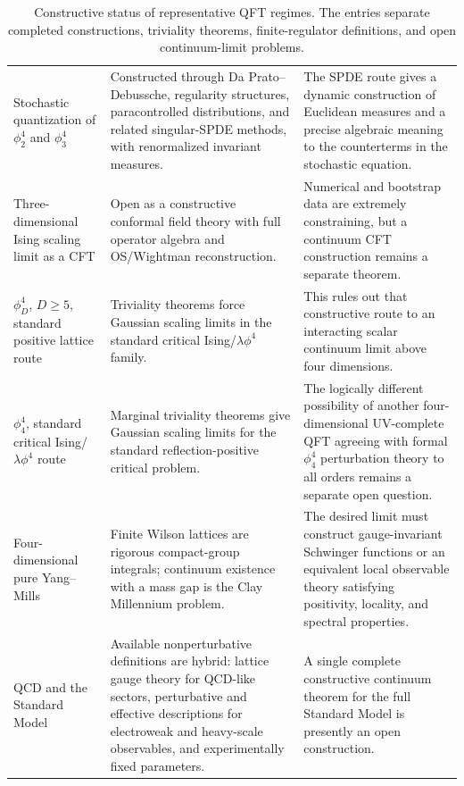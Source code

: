 \begin{table}[H]
\begin{tabular}{@{}>{\raggedright\arraybackslash}p{}
  >{\raggedright\arraybackslash}p{}
  >{\raggedright\arraybackslash}p{}@{}}
Stochastic quantization of \(\phi^4_2\) and \(\phi^4_3\) &
Constructed through Da Prato--Debussche, regularity structures,
paracontrolled distributions, and related singular-SPDE methods, with
renormalized invariant measures. &
The SPDE route gives a dynamic construction of Euclidean measures and a
precise algebraic meaning to the counterterms in the stochastic equation. \\
Three-dimensional Ising scaling limit as a CFT &
Open as a constructive conformal field theory with full operator algebra and
OS/Wightman reconstruction. &
Numerical and bootstrap data are extremely constraining, but a continuum CFT
construction remains a separate theorem. \\
\(\phi^4_D\), \(D\ge5\), standard positive lattice route &
Triviality theorems force Gaussian scaling limits in the standard critical
Ising/\(\lambda\phi^4\) family. &
This rules out that constructive route to an interacting scalar continuum
limit above four dimensions. \\
\(\phi^4_4\), standard critical Ising/\(\lambda\phi^4\) route &
Marginal triviality theorems give Gaussian scaling limits for the standard
reflection-positive critical problem. &
The logically different possibility of another four-dimensional UV-complete
QFT agreeing with formal \(\phi^4_4\) perturbation theory to all orders
remains a separate open question. \\
Four-dimensional pure Yang--Mills &
Finite Wilson lattices are rigorous compact-group integrals; continuum
existence with a mass gap is the Clay Millennium problem. &
The desired limit must construct gauge-invariant Schwinger functions or an
equivalent local observable theory satisfying positivity, locality, and
spectral properties. \\
QCD and the Standard Model &
Available nonperturbative definitions are hybrid: lattice gauge theory for
QCD-like sectors, perturbative and effective descriptions for electroweak and
heavy-scale observables, and experimentally fixed parameters. &
A single complete constructive continuum theorem for the full Standard Model
is presently an open construction. \\
\hline
\end{tabular}
\caption{Constructive status of representative QFT regimes.  The entries
separate completed constructions, triviality theorems, finite-regulator
definitions, and open continuum-limit problems.}
\label{tab:constructive-master-status}
\end{table}

